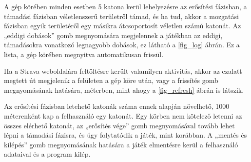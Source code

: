 

A gép körében minden esetben 5 katona kerül lehelyezésre az erősítési fázisban, a támadási fázisban véletlenszerű területről támad, és ha tud, akkor a mozgatási fázisban egyik területéről egy másikra átcsoportosít véletlen számú katonát. Az „eddigi dobások” gomb megnyomására megjelennek a játékban az eddigi, támadásokra vonatkozó legnagyobb dobások, ez látható a \ref{fig_log} ábrán. Ez a lista, a gép körében megnyitva automatikusan frissül. 



Ha a Strava weboldalára feltöltésre került valamilyen aktivitás, akkor az ezalatt megtett út megjelenik a felületen a gép köre után, vagy a frissítés gomb megnyomásának hatására, méterben, mint ahogy a \ref{fig_refresh} ábrán is látszik. 



Az erősítési fázisban letehető katonák száma ennek alapján növelhető, 1000 méterenként kap a felhasználó egy katonát. Egy körben nem kötelező letenni az összes elérhető katonát, az „erősítés vége” gomb megnyomásával tovább lehet lépni a támadási fázisra, és úgy folytatódik a játék, mint korábban. A „mentés és kilépés” gomb megnyomásának hatására a játék elmentésre kerül a felhasználó adataival és a program kilép.